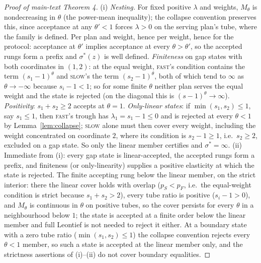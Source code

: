 \documentclass[preprint,11pt,authoryear]{elsarticle}
\theoremstyle{remark}
\newcommand{\act}[1]{\textsc{#1}}
\begin{document}
\begin{proof}[Proof of main-text Theorem 4]
(i) \emph{Nesting.} For fixed positive $\lambda$ and weights, $M_\theta$ is nondecreasing in $\theta$ (the power-mean inequality); the collapse convention preserves this, since acceptance at any $\theta'<1$ forces $\lambda>0$ on the serving plan's tube, where the family is defined. Per plan and weight, hence per weight, hence for the protocol: acceptance at $\theta'$ implies acceptance at every $\theta>\theta'$, so the accepted rungs form a prefix and $\sigma^*(z)$ is well defined. \emph{Finiteness} on gap states with both coordinates in $(1,2)$: at the equal weight, \act{fast}'s condition contains the term $(s_1-1)^\theta$ and \act{slow}'s the term $(s_2-1)^\theta$, both of which tend to $\infty$ as $\theta\to-\infty$ because $s_i-1<1$; so for some finite $\theta$ neither plan serves the equal weight and the state is rejected (on the diagonal this is $(s-1)^\theta\to\infty$). \emph{Positivity}: $s_1+s_2\ge2$ accepts at $\theta=1$. \emph{Only-linear states}: if $\min(s_1,s_2)\le1$, say $s_1\le1$, then \act{fast}'s trough has $\lambda_1=s_1-1\le0$ and is rejected at every $\theta<1$ by Lemma~\ref{lem:collapse}; \act{slow} alone must then cover every weight, including the weight concentrated on coordinate $2$, where its condition is $s_2-1\ge1$, i.e.\ $s_2\ge2$, excluded on a gap state. So only the linear member certifies and $\sigma^*=\infty$.
(ii) Immediate from (i): every gap state is linear-accepted, the accepted rungs form a prefix, and finiteness (or only-linearity) supplies a positive elasticity at which the state is rejected. The finite accepting rung below the linear member, on the strict interior: there the linear cover holds with overlap ($p_S<p_F$, i.e.\ the equal-weight condition is strict because $s_1+s_2>2$), every tube ratio is positive ($s_i-1>0$), and $M_\theta$ is continuous in $\theta$ on positive tubes, so the cover persists for every $\theta$ in a neighbourhood below $1$; the state is accepted at a finite order below the linear member and full Leontief is not needed to reject it either. At a boundary state with a zero tube ratio ($\min(s_1,s_2)\le1$) the collapse convention rejects every $\theta<1$ member, so such a state is accepted at the linear member only, and the strictness assertions of (i)--(ii) do not cover boundary equalities.

\end{proof}
\end{document}
